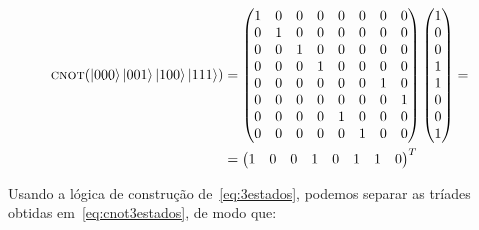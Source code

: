 \begin{equation}\label{eq:cnot3estados}
	\begin{split}
		\operatorname{\textsc{cnot}} (\ket{000}\ket{001}\ket{100}\ket{111}) &= \begin{pmatrix}
		1 & 0 & 0 & 0 & 0 & 0 & 0 & 0 \\
		0 & 1 & 0 & 0 & 0 & 0 & 0 & 0 \\
		0 & 0 & 1 & 0 & 0 & 0 & 0 & 0 \\
		0 & 0 & 0 & 1 & 0 & 0 & 0 & 0 \\
		0 & 0 & 0 & 0 & 0 & 0 & 1 & 0 \\
		0 & 0 & 0 & 0 & 0 & 0 & 0 & 1 \\
		0 & 0 & 0 & 0 & 1 & 0 & 0 & 0 \\
		0 & 0 & 0 & 0 & 0 & 1 & 0 & 0 		
		\end{pmatrix} \begin{pmatrix}
		1 \\
		0 \\
		0 \\
		1 \\
		1 \\
		0 \\
		0 \\
		1
		\end{pmatrix} = \\
		&=\begin{pmatrix}
		1 & 0 &	0 & 1 &	0 &	1 &	1 &	0
		\end{pmatrix}^T
	\end{split}
\end{equation}

Usando a lógica de construção de~\eqref{eq:3estados}, podemos separar as tríades obtidas em~\eqref{eq:cnot3estados}, de modo que:

